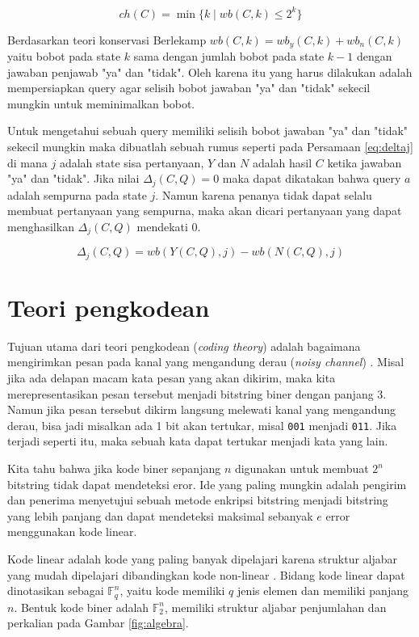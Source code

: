 \begin{equation} \label{eq:character}
ch(C) = \min\{k \mid wb(C,k) \leq 2^k\}
\end{equation}

Berdasarkan teori konservasi Berlekamp \cite{Deppe2004} $wb(C,k) = wb_y(C,k) + wb_n(C,k)$ yaitu bobot pada state $k$ sama dengan jumlah bobot pada state $k-1$ dengan jawaban penjawab "ya" dan "tidak". Oleh karena itu yang harus dilakukan adalah mempersiapkan query agar selisih bobot jawaban "ya" dan "tidak" sekecil mungkin untuk meminimalkan bobot.

Untuk mengetahui sebuah query memiliki selisih bobot jawaban "ya" dan "tidak" sekecil mungkin maka dibuatlah sebuah rumus seperti pada Persamaan \ref{eq:deltaj} di mana $j$ adalah state sisa pertanyaan, $Y$ dan $N$ adalah hasil $C$ ketika jawaban "ya" dan "tidak". Jika nilai $\Delta_j(C,Q) = 0$ maka dapat dikatakan bahwa query $a$ adalah sempurna pada state $j$. Namun karena penanya tidak dapat selalu membuat pertanyaan yang sempurna, maka akan dicari pertanyaan yang dapat menghasilkan $\Delta_j(C,Q)$ mendekati $0$.

\begin{equation}
\label{eq:deltaj}
\Delta_j(C,Q) = wb(Y(C,Q),j) - wb(N(C,Q),j)
\end{equation}


\section{Teori pengkodean}

Tujuan utama dari teori pengkodean (\textit{coding theory}) adalah bagaimana mengirimkan pesan pada kanal yang mengandung derau (\textit{noisy channel}) \cite{VanLint2016}. Misal jika ada delapan macam kata pesan yang akan dikirim, maka kita merepresentasikan pesan tersebut menjadi bitstring biner dengan panjang 3. Namun jika pesan tersebut dikirm langsung melewati kanal yang mengandung derau, bisa jadi misalkan ada 1 bit akan tertukar, misal \texttt{001} menjadi \texttt{011}. Jika terjadi seperti itu, maka sebuah kata dapat tertukar menjadi kata yang lain.

Kita tahu bahwa jika kode biner sepanjang $n$ digunakan untuk membuat $2^n$ bitstring tidak dapat mendeteksi eror. Ide yang paling mungkin adalah pengirim dan penerima menyetujui sebuah metode enkripsi bitstring menjadi bitstring yang lebih panjang dan dapat mendeteksi maksimal sebanyak $e$ error menggunakan kode linear.

Kode linear adalah kode yang paling banyak dipelajari karena struktur aljabar yang mudah dipelajari dibandingkan kode non-linear \cite{Huffman}. Bidang kode linear dapat dinotasikan sebagai $\mathbb{F}_q^n$, yaitu kode memiliki $q$ jenis elemen dan memiliki panjang $n$. Bentuk kode biner adalah $\mathbb{F}_2^n$, memiliki struktur aljabar penjumlahan dan perkalian pada Gambar \ref{fig:algebra}.

